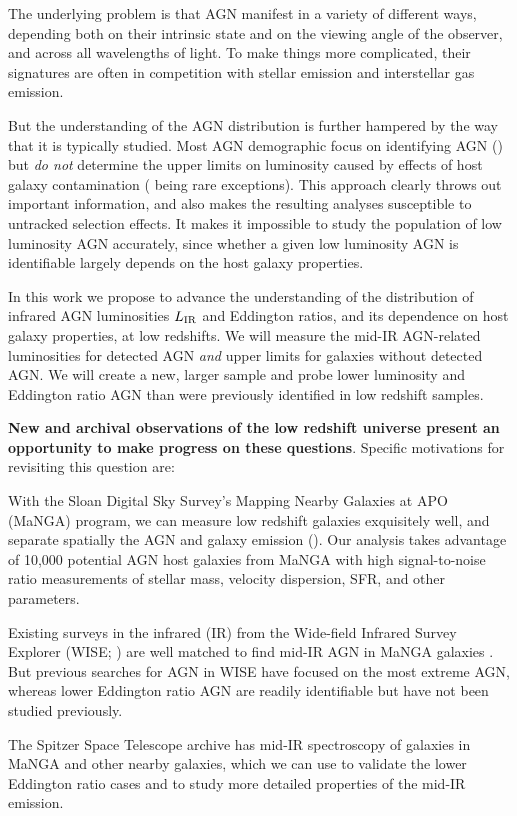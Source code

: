 \documentclass[12pt, preprint]{hacked-aastex}
\newlength{\mylen}
\newenvironment{ditemize}
{ \begin{list}{}{%
\setlength{\topsep}{0pt}%
\setlength{\partopsep}{3pt}%
\setlength{\itemsep}{1pt}\setlength{\parsep}{1pt}%
\setlength{\itemindent}{0pt}\setlength{\listparindent}{12pt}%
\setlength{\leftmargin}{24pt}\setlength{\rightmargin}{0in}%
\setlength{\labelsep}{3pt}\setlength{\labelwidth}{6pt}%
\setlength{\mylen}{3pt}
\renewcommand{\makelabel}{\makebox[\labelwidth][l]{\raisebox{\mylen}{\tiny$\bullet$}\hspace{\fill}}}}}
{\end{list}}
\begin{document}
The underlying problem is that AGN manifest in a variety of different
ways, depending both on their intrinsic state and on the viewing angle
of the observer, and across all wavelengths of light.  To make things
more complicated, their signatures are often in competition with
stellar emission and interstellar gas emission. 

But the understanding of the AGN distribution is further hampered by 
the  way that it is typically studied. Most AGN demographic 
focus on identifying AGN (\cite{kauffmann03b, lacy15a, sanchez19a, 
comerford20a, greene20a}) 
but {\it do not}  determine the upper limits on luminosity caused by
effects of host galaxy contamination 
(\cite{trump15a, jones17a} being rare exceptions). This approach clearly 
throws out important information, and also makes the resulting analyses 
susceptible to  untracked selection effects. It makes it impossible
to study the population of low luminosity AGN accurately, since whether
a given low luminosity AGN is identifiable largely depends on the
host galaxy properties.

In this work we propose to advance the understanding of the
distribution of infrared AGN luminosities $L_{\rm IR}$ and 
Eddington ratios, and its dependence on host galaxy properties,
at low redshifts.  We will measure the mid-IR
AGN-related luminosities for detected AGN {\it and} upper limits for
galaxies without detected AGN. We will create a new, larger sample
and probe lower luminosity and Eddington ratio AGN than were
previously identified in low redshift samples.

{\bf New and archival observations of the low redshift universe
  present an opportunity to make progress on these
  questions}. Specific motivations for revisiting this question are:
\begin{ditemize}
\item With the Sloan Digital Sky Survey's Mapping Nearby Galaxies at
  APO (MaNGA) program, we can measure low redshift galaxies
  exquisitely well, and separate spatially the AGN and galaxy emission
  (\cite{bundy15a, blanton17a}).  Our analysis takes advantage of
  10,000 potential AGN host galaxies from MaNGA with high
  signal-to-noise ratio measurements of stellar mass, velocity
  dispersion, SFR, and other parameters.
\item Existing surveys in the infrared (IR) from the Wide-field
  Infrared Survey Explorer (WISE; \cite{wright10a}) are well matched
  to find mid-IR AGN in MaNGA galaxies \cite{comerford20a}. But
  previous searches for AGN in WISE have focused on the most extreme
  AGN, whereas lower Eddington ratio AGN are readily identifiable but
  have not been studied previously.
\item The Spitzer Space Telescope archive has mid-IR spectroscopy of
  galaxies in MaNGA and other nearby galaxies, which we can use to
  validate the lower Eddington ratio cases and to study more detailed
  properties of the mid-IR emission.
\end{ditemize}
\end{document}
